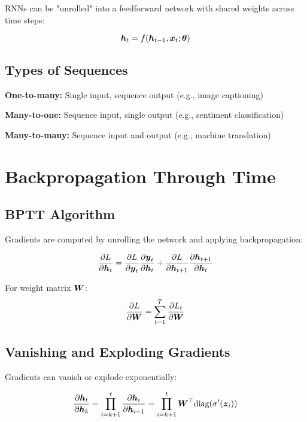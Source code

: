 RNNs can be "unrolled" into a feedforward network with shared weights across time steps:

\begin{equation}
\boldsymbol{h}_t = f(\boldsymbol{h}_{t-1}, \boldsymbol{x}_t; \boldsymbol{\theta})
\end{equation}

\subsection{Types of Sequences}

\textbf{One-to-many:} Single input, sequence output (e.g., image captioning)

\textbf{Many-to-one:} Sequence input, single output (e.g., sentiment classification)

\textbf{Many-to-many:} Sequence input and output (e.g., machine translation)

\section{Backpropagation Through Time}
\label{sec:bptt}

\subsection{BPTT Algorithm}

Gradients are computed by unrolling the network and applying backpropagation:

\begin{equation}
\frac{\partial L}{\partial \boldsymbol{h}_t} = \frac{\partial L}{\partial \boldsymbol{y}_t} \frac{\partial \boldsymbol{y}_t}{\partial \boldsymbol{h}_t} + \frac{\partial L}{\partial \boldsymbol{h}_{t+1}} \frac{\partial \boldsymbol{h}_{t+1}}{\partial \boldsymbol{h}_t}
\end{equation}

For weight matrix $\boldsymbol{W}$:
\begin{equation}
\frac{\partial L}{\partial \boldsymbol{W}} = \sum_{t=1}^{T} \frac{\partial L_t}{\partial \boldsymbol{W}}
\end{equation}

\subsection{Vanishing and Exploding Gradients}

Gradients can vanish or explode exponentially:

\begin{equation}
\frac{\partial \boldsymbol{h}_t}{\partial \boldsymbol{h}_k} = \prod_{i=k+1}^{t} \frac{\partial \boldsymbol{h}_i}{\partial \boldsymbol{h}_{i-1}} = \prod_{i=k+1}^{t} \boldsymbol{W}^\top \text{diag}(\sigma'(\boldsymbol{z}_i))
\end{equation}


